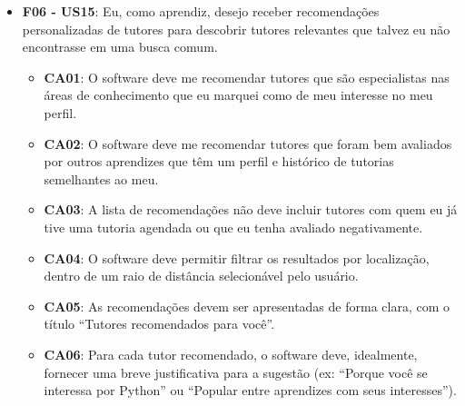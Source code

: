 \begin{itemize}
\begin{itemize}
\item \textbf{CA02}: Os resultados da busca devem poder ser ordenados por nota média de avaliação (do maior para o menor).

\item \textbf{CA03}: Os resultados da busca devem poder ser ordenados por número de tutorias realizadas (do maior para o menor).

\item \textbf{CA04}: O software deve permitir filtrar os resultados por localização, dentro de um raio de distância selecionável pelo usuário.

\item \textbf{CA05}:  O software deve exibir o número total de tutores encontrados que correspondem aos critérios de busca e filtro.

\end{itemize}


\item \textbf{F06 - US15}: Eu, como aprendiz, desejo receber recomendações personalizadas de tutores para descobrir tutores relevantes que talvez eu não encontrasse em uma busca comum.

\begin{itemize}

\item \textbf{CA01}: O software deve me recomendar tutores que são especialistas nas áreas de conhecimento que eu marquei como de meu interesse no meu perfil.

\item \textbf{CA02}: O software deve me recomendar tutores que foram bem avaliados por outros aprendizes que têm um perfil e histórico de tutorias semelhantes ao meu.

\item \textbf{CA03}: A lista de recomendações não deve incluir tutores com quem eu já tive uma tutoria agendada ou que eu tenha avaliado negativamente.

\item \textbf{CA04}: O software deve permitir filtrar os resultados por localização, dentro de um raio de distância selecionável pelo usuário.

\item \textbf{CA05}: As recomendações devem ser apresentadas de forma clara, com o título ``Tutores recomendados para você''.

\item \textbf{CA06}: Para cada tutor recomendado, o software deve, idealmente, fornecer uma breve justificativa para a sugestão (ex: ``Porque você se interessa por Python'' ou ``Popular entre aprendizes com seus interesses'').


\end{itemize}
\end{itemize}
